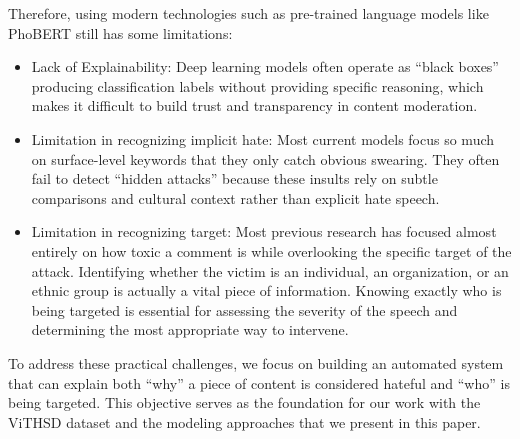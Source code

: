 \documentclass[11pt]{article}
\begin{document}
Therefore, using modern technologies such as pre-trained language models like PhoBERT still
has some limitations:
\begin{itemize}[leftmargin=*]
\item Lack of Explainability: Deep learning models often operate as ``black boxes''
producing classification labels without providing specific reasoning, which makes it
difficult to build trust and transparency in content moderation.
\item Limitation in recognizing implicit hate: Most current models focus so much on
surface-level keywords that they only catch obvious swearing. They often fail to detect
``hidden attacks'' because these insults rely on subtle comparisons and cultural context
rather than explicit hate speech.
\item Limitation in recognizing target: Most previous research has focused almost entirely
on how toxic a comment is while overlooking the specific target of the attack.
Identifying whether the victim is an individual, an organization, or an ethnic group is
actually a vital piece of information. Knowing exactly who is being targeted is essential
for assessing the severity of the speech and determining the most appropriate way to
intervene.
\end{itemize}

To address these practical challenges, we focus on building an automated system that can
explain both ``why'' a piece of content is considered hateful and ``who'' is being targeted. This
objective serves as the foundation for our work with the ViTHSD dataset and the modeling
approaches that we present in this paper.
\end{document}
